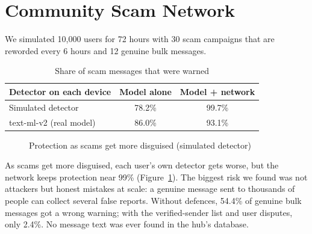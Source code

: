 \section{Community Scam Network}
\noindent We simulated 10,000 users for 72 hours with 30 scam campaigns that are reworded every 6 hours and 12 genuine bulk messages.

\begin{table}[H]
\centering
\small
\renewcommand{\arraystretch}{1.15}
\caption{Share of scam messages that were warned}
\label{tab:net1}
\begin{tabular}{|l|c|c|}
\hline
\textbf{Detector on each device} & \textbf{Model alone} & \textbf{Model + network} \\ \hline
Simulated detector & 78.2\% & 99.7\% \\ \hline
text-ml-v2 (real model) & 86.0\% & 93.1\% \\ \hline
\end{tabular}
\end{table}

\begin{figure}[H]
\centering
{}
\caption{Protection as scams get more disguised (simulated detector)}
\label{fig:netmut}
\end{figure}

\noindent As scams get more disguised, each user's own detector gets worse, but the network keeps protection near 99\% (Figure~\ref{fig:netmut}). The biggest risk we found was not attackers but honest mistakes at scale: a genuine message sent to thousands of people can collect several false reports. Without defences, 54.4\% of genuine bulk messages got a wrong warning; with the verified-sender list and user disputes, only 2.4\%. No message text was ever found in the hub's database.

